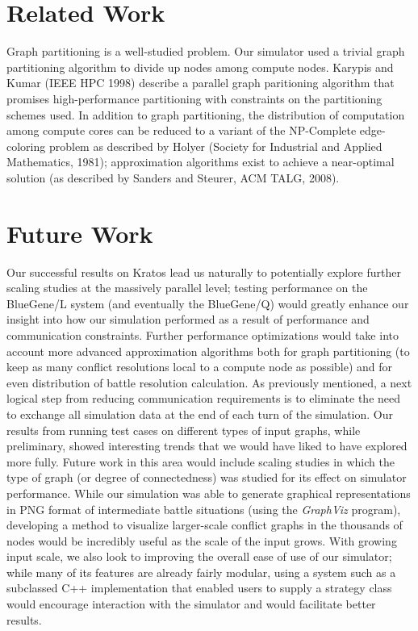 \documentclass[10pt]{article}
\begin{document}
\begin{multicols}{2}
		\section*{Related Work}
		Graph partitioning is a well-studied problem.  
		Our simulator used a trivial graph partitioning algorithm to divide up nodes among compute nodes.  
		Karypis and Kumar (IEEE HPC 1998) describe a parallel graph paritioning algorithm that promises high-performance partitioning with constraints on the partitioning schemes used.  
		In addition to graph partitioning, the distribution of computation among compute cores can be reduced to a variant of the NP-Complete edge-coloring problem as described by Holyer (Society for Industrial and Applied Mathematics, 1981); approximation algorithms exist to achieve a near-optimal solution (as described by Sanders and Steurer, ACM TALG, 2008).

		\section*{Future Work}

		Our successful results on Kratos lead us naturally to potentially explore further scaling studies at the massively parallel level; testing performance on the BlueGene/L system (and eventually the BlueGene/Q) would greatly enhance our insight into how our simulation performed as a result of performance and communication constraints.  
		Further performance optimizations would take into account more advanced approximation algorithms both for graph partitioning (to keep as many conflict resolutions local to a compute node as possible) and for even distribution of battle resolution calculation.  
		As previously mentioned, a next logical step from reducing communication requirements is to eliminate the need to exchange all simulation data at the end of each turn of the simulation.  
		Our results from running test cases on different types of input graphs, while preliminary, showed interesting trends that we would have liked to have explored more fully.  
		Future work in this area would include scaling studies in which the type of graph (or degree of connectedness) was studied for its effect on simulator performance.
		While our simulation was able to generate graphical representations in PNG format of intermediate battle situations (using the \emph{GraphViz} program), developing a method to visualize larger-scale conflict graphs in the thousands of nodes would be incredibly useful as the scale of the input grows.  
		With growing input scale, we also look to improving the overall ease of use of our simulator; while many of its features are already fairly modular, using a system such as a subclassed C++ implementation that enabled users to supply a strategy class would encourage interaction with the simulator and would facilitate better results. 

	\end{multicols}
\end{document}
